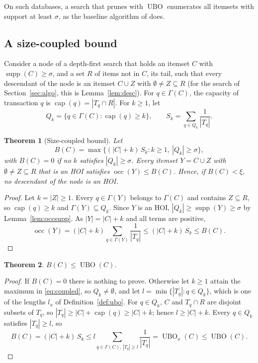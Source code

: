 \documentclass[pdflatex,sn-mathphys,Numbered]{sn-jnl}
\theoremstyle{thmstyleone}
\newtheorem{theorem}{Theorem}
\theoremstyle{thmstyletwo}
\theoremstyle{thmstylethree}
\newcommand{\supp}{\operatorname{supp}}
\newcommand{\occ}{\operatorname{occ}}
\newcommand{\ubo}{\operatorname{UBO}}
\newcommand{\capa}{\operatorname{cap}}
\begin{document}
On such databases, a search that prunes with $\ubo$ enumerates all itemsets with support at least $\sigma$, as the baseline algorithm of \cite{deng2020hoi} does.

\subsection{A size-coupled bound}

Consider a node of a depth-first search that holds an itemset $C$ with $\supp(C) \ge \sigma$, and a set $R$ of items not in $C$, its tail, such that every descendant of the node is an itemset $C \cup Z$ with $\emptyset \ne Z \subseteq R$ (for the search of Section~\ref{sec:algo}, this is Lemma~\ref{lem:desc}). For $q \in \Gamma(C)$, the capacity of transaction $q$ is $\capa(q) = |T_q \cap R|$. For $k \ge 1$, let
\[
Q_k = \{ q \in \Gamma(C) : \capa(q) \ge k \}, \qquad S_k = \sum_{q \in Q_k} \frac{1}{|T_q|}.
\]

\begin{theorem}[Size-coupled bound]\label{thm:coupled}
Let
\begin{equation}\label{eq:coupled}
B(C) = \max \{ (|C| + k) \, S_k : k \ge 1,\ |Q_k| \ge \sigma \},
\end{equation}
with $B(C) = 0$ if no $k$ satisfies $|Q_k| \ge \sigma$. Every itemset $Y = C \cup Z$ with $\emptyset \neq Z \subseteq R$ that is an HOI satisfies $\occ(Y) \le B(C)$. Hence, if $B(C) < \xi$, no descendant of the node is an HOI.
\end{theorem}
\begin{proof}
Let $k = |Z| \ge 1$. Every $q \in \Gamma(Y)$ belongs to $\Gamma(C)$ and contains $Z \subseteq R$, so $\capa(q) \ge k$ and $\Gamma(Y) \subseteq Q_k$. Since $Y$ is an HOI, $|Q_k| \ge \supp(Y) \ge \sigma$ by Lemma~\ref{lem:occsupp}. As $|Y| = |C| + k$ and all terms are positive,
\[
\occ(Y) = (|C| + k) \sum_{q \in \Gamma(Y)} \frac{1}{|T_q|} \le (|C| + k) \, S_k \le B(C).
\]
\end{proof}

\begin{theorem}\label{thm:dominance}
$B(C) \le \ubo(C)$.
\end{theorem}
\begin{proof}
If $B(C) = 0$ there is nothing to prove. Otherwise let $k \ge 1$ attain the maximum in \eqref{eq:coupled}, so $Q_k \neq \emptyset$, and let $l = \min \{ |T_q| : q \in Q_k \}$, which is one of the lengths $l_x$ of Definition~\ref{def:ubo}. For $q \in Q_k$, $C$ and $T_q \cap R$ are disjoint subsets of $T_q$, so $|T_q| \ge |C| + \capa(q) \ge |C| + k$; hence $l \ge |C| + k$. Every $q \in Q_k$ satisfies $|T_q| \ge l$, so
\[
B(C) = (|C| + k) \, S_k \le l \sum_{q \in \Gamma(C),\, |T_q| \ge l} \frac{1}{|T_q|} = \ubo_x(C) \le \ubo(C).
\]
\end{proof}
\end{document}
